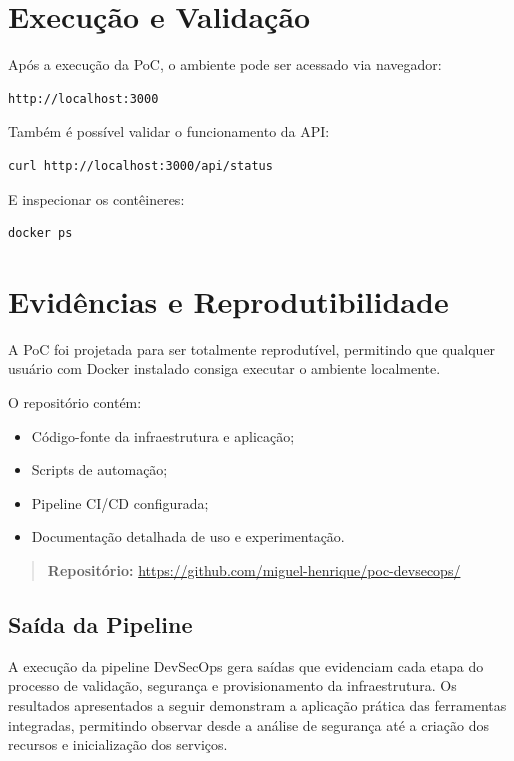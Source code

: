 \section{Execução e Validação}

Após a execução da PoC, o ambiente pode ser acessado via navegador:

\begin{verbatim}
http://localhost:3000
\end{verbatim}

Também é possível validar o funcionamento da API:

\begin{verbatim}
curl http://localhost:3000/api/status
\end{verbatim}

E inspecionar os contêineres:

\begin{verbatim}
docker ps
\end{verbatim}

\section{Evidências e Reprodutibilidade}

A PoC foi projetada para ser totalmente reprodutível, permitindo que qualquer usuário com Docker instalado consiga executar o ambiente localmente.

O repositório contém:

\begin{itemize}
\item Código-fonte da infraestrutura e aplicação;
\item Scripts de automação;
\item Pipeline CI/CD configurada;
\item Documentação detalhada de uso e experimentação.
\end{itemize}

\begin{quote}
\textbf{Repositório:} \url{https://github.com/miguel-henrique/poc-devsecops/}
\end{quote}


\subsection{Saída da Pipeline}

A execução da pipeline DevSecOps gera saídas que evidenciam cada etapa do processo de validação, segurança e provisionamento da infraestrutura. Os resultados apresentados a seguir demonstram a aplicação prática das ferramentas integradas, permitindo observar desde a análise de segurança até a criação dos recursos e inicialização dos serviços.

